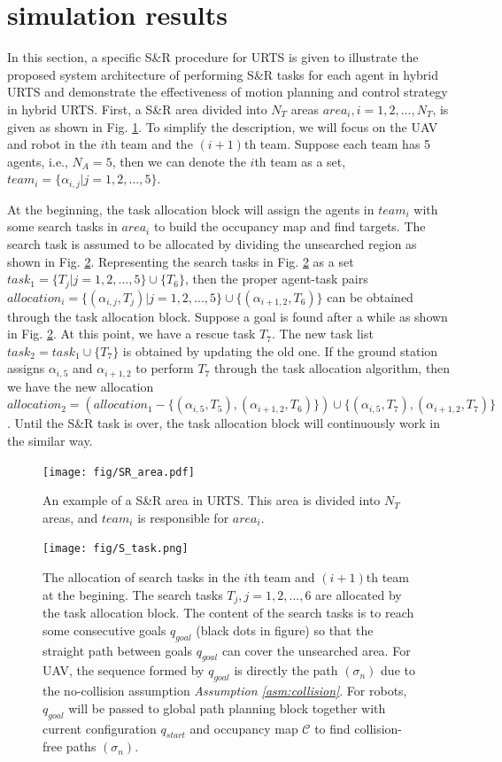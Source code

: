 \documentclass{ieeeaccess}
\begin{document}
\section{simulation results}
In this section, a specific S\&R procedure for URTS is given to illustrate the proposed system architecture of performing S\&R tasks for each agent in hybrid URTS and demonstrate the effectiveness of motion planning and control strategy in hybrid URTS. First, a S\&R area divided into $N_T$ areas $area_i,i=1,2,...,N_T$, is given as shown in Fig. \ref{fig:SR_area}. To simplify the description, we will focus on the UAV and robot in the $i$th team and the $(i+1)$th team. Suppose each team has 5 agents, i.e., $N_A=5$, then we can denote the $i$th team as a set, $team_i=\{ \alpha_{i,j} | j=1,2,...,5 \}$.

At the beginning, the task allocation block will assign the agents in $team_i$ with some search tasks in $area_i$ to build the occupancy map and find targets. The search task is assumed to be allocated by dividing the unsearched region as shown in Fig. \ref{fig:S_task}. Representing the search tasks in Fig. \ref{fig:S_task} as a set $task_1=\{ T_j | j=1,2,...,5 \}\cup\{T_6\}$, then the proper agent-task pairs $allocation_i=\{ (\alpha_{i,j},T_j) | j=1,2,...,5 \}\cup\{(\alpha_{i+1,2},T_6)\}$ can be obtained through the task allocation block. Suppose a goal is found after a while as shown in Fig. \ref{fig:S_task}. At this point, we have a rescue task $T_7$. The new task list $task_2=task_1\cup\{ T_7 \}$ is obtained by updating the old one. If the ground station assigns $\alpha_{i,5}$ and $\alpha_{i+1,2}$ to perform $T_7$ through the task allocation algorithm, then we have the new allocation $allocation_2=(allocation_1-\{ (\alpha_{i,5},T_5),(\alpha_{i+1,2},T_6) \})\cup\{ (\alpha_{i,5},T_7),(\alpha_{i+1,2},T_7) \}$. Until the S\&R task is over, the task allocation block will continuously work in the similar way.
\begin{figure}[htbp]
    \centering
    \texttt{[image: fig/SR\_area.pdf]}\caption{An example of a S\&R area in URTS. This area is divided into $N_T$ areas, and $team_i$ is responsible for $area_i$.}%
    \label{fig:SR_area}
\end{figure}
\begin{figure}[htbp]
    \centering
    \texttt{[image: fig/S\_task.png]}\caption{The allocation of search tasks in the $i$th team and $(i+1)$th team at the begining. The search tasks $T_j,j=1,2,...,6$ are allocated by the task allocation block. The content of the search tasks is to reach some consecutive goals $q_{goal}$ (black dots in figure) so that the straight path between goals $q_{goal}$ can cover the unsearched area. For UAV, the sequence formed by $q_{goal}$ is directly the path $(\sigma_n)$ due to the no-collision assumption \textit{Assumption \ref{asm:collision}}. For robots, $q_{goal}$ will be passed to global path planning block together with current configuration $q_{start}$ and occupancy map $\mathcal{C}$ to find collision-free paths $(\sigma_n)$.}
    \label{fig:S_task}
\end{figure}
\end{document}
